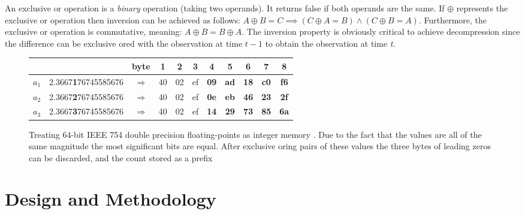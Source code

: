 An exclusive or operation is a \textit{binary} operation (taking two operands). It returns false if both operands are the same. If $\oplus$ represents 
the exclusive or operation then inversion can be achieved as follows: $A\oplus B = C \implies (C\oplus A = B) \wedge (C\oplus B = A)$. Furthermore, the exclusive or operation is commutative, 
meaning: $A\oplus B = B\oplus A$. The inversion property is obviously critical to achieve decompression since the difference can be exclusive ored with the observation at time $t-1$ to obtain 
the observation at time \textit{t}.
\begin{figure}[h!]
\begin{mdframed}
\centering
\begin{tabular}{|c|c|c|c c c c c c c c|}
 \hline
  & & byte & 1 & 2 & 3 & 4 & 5 & 6 & 7 & 8\\
 \hline
 $a_{1}$ & 2.3667\textbf{1}76745585676 & $\Rightarrow$ & 40 & 02 & ef & \textbf{09} & \textbf{ad} & \textbf{18} & \textbf{c0} & \textbf{f6} \\
 \hline
 $a_{2}$ & 2.3667\textbf{2}76745585676 & $\Rightarrow$ & 40 & 02 & ef & \textbf{0e} & \textbf{eb} & \textbf{46} & \textbf{23} & \textbf{2f} \\
 \hline
 $a_{3}$ & 2.3667\textbf{3}76745585676 & $\Rightarrow$ & 40 & 02 & ef & \textbf{14} & \textbf{29} & \textbf{73} & \textbf{85} & \textbf{6a} \\
 \hline
\end{tabular}
\caption[Treating 64-bit IEEE 754 floating-points as integer memory]{Treating 64-bit IEEE 754 double precision floating-points as integer memory \cite{engelson2000lossless}. Due to the fact that the values are
 all of the same magnitude the most significant bits are equal. After exclusive oring pairs of these values the three bytes of leading zeros can be discarded, and 
 the count stored as a prefix}
 \label{INT_REP}
\end{mdframed}
\end{figure}
\section{Design and Methodology}
